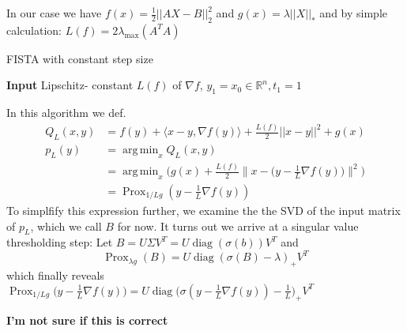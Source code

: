 \documentclass{article}
\DeclareMathOperator*{\argmin}{arg\,min}
\DeclareMathOperator{\Prox}{Prox}
\DeclareMathOperator{\diag}{diag}
\begin{document}
In our case we have $f(x) = \frac{1}{2} ||AX - B||_2^2$ and $g(x) =  \lambda||X||_*$ and by simple calculation: $L(f) = 2\lambda_{\max}(A^TA)$
\begin{algorithm}[H]
\caption{FISTA with constant step size}
\hspace*{\algorithmicindent} \textbf{Input} Lipschitz- constant $L(f)$ of $\nabla f$, $y_1 = x_0 \in \mathbb{R}^n, t_1=1$
\begin{algorithmic}[1]
\EndFor
\end{algorithmic}
\end{algorithm}


In this algorithm we def. 
\begin{align*}
Q_L(x,y) &= f(y) + \langle x-y, \nabla f(y) \rangle + \frac{L(f)}{2} ||x-y||^2 + g(x)\\
p_L(y) &= \argmin_x Q_L(x,y)\\
&= \argmin_x \Big( g(x) + \frac{L(f)}{2} \Big\| x - \Big( y - \frac{1}{L} \nabla f(y)\Big)\Big\|^2 \Big)\\
&= \Prox_{1/L g}(y - \frac{1}{L}\nabla f(y))
\end{align*}
To simplfify this expression further, we examine the the SVD of the input matrix of $p_L$, which we call $B$ for now. It turns out we arrive at a singular value thresholding step: Let $B = U \Sigma V^T = U \diag(\sigma(b)) V^T$ and
$$\Prox_{\lambda g}(B) = U \diag(\sigma(B) - \lambda)_+ V^T$$
which finally reveals $\Prox_{1/L g} \Big(y - \frac{1}{L} \nabla f(y) \Big) = U \diag \Big(\sigma(y - \frac{1}{L} \nabla f(y)) - \frac{1}{L}\Big)_+ V^T$


\textbf{I'm not sure if this is correct}
\end{document}
